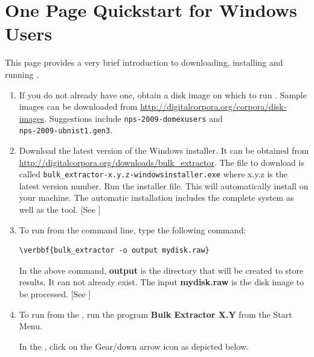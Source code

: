\documentclass[11pt]{article} %
\begin{document}
\section*{One Page Quickstart for Windows Users}
This page provides a very brief introduction to downloading, installing and running \bulk. 
\begin{enumerate}
\item If you do not already have one, obtain a disk image on which to run \bulk. Sample images can be downloaded from \url{http://digitalcorpora.org/corpora/disk-images}. Suggestions include \texttt{nps-2009-domexusers} and \\ \texttt{nps-2009-ubnist1.gen3}.
\item Download the latest version of the \bulk Windows installer. It can be obtained from \url{http://digitalcorpora.org/downloads/bulk_extractor}. The file to download is called \texttt{bulk\_extractor-x.y.z-windowsinstaller.exe} where x.y.z is the latest version number.  Run the installer file. This will automatically install \bulk on your machine. The automatic installation includes the complete \bulk system as well as the \viewer tool. [See \textbf{} \textbf{}]

\item To run \bulk from the command line, type the following command:
\begin{Verbatim}[commandchars=\\\{\}]
\verbbf{bulk_extractor -o output mydisk.raw}
\end{Verbatim} 

In the above command, \textbf{output} is the directory that will be created to store \bulk results.  It can not already exist. The input \textbf{mydisk.raw} is the disk image to be processed.
[See  \textbf{} \textbf{}]

\item To run \bulk from the \viewer, run the program \textbf{Bulk Extractor X.Y} from the Start Menu. 

In the \viewer, click on the Gear/down arrow icon as depicted below. 
\noindent
\begin{minipage}{\linewidth}
\label{fig:runBulk}
\end{minipage}


\end{enumerate}
\end{document}
